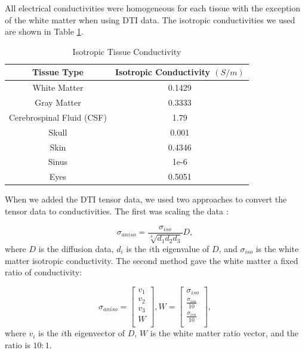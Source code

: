 All electrical conductivities were homogeneous for each tissue with the exception of the white matter when using DTI data. The isotropic conductivities \cite{ref:cond} we used are shown in Table \ref{tab:cond}.

\begin{table}[H]
\centering
\caption{Isotropic Tissue Conductivity}
\label{tab:cond}
\begin{tabular}{|c|c|}
\hline
Tissue Type               & Isotropic Conductivity $(S/m)$ \\ \hline
\hline
White Matter              & 0.1429                         \\ \hline
Gray Matter               & 0.3333                         \\ \hline
Cerebrospinal Fluid (CSF) & 1.79                           \\ \hline
Skull                     & 0.001                          \\ \hline
Skin                      & 0.4346                         \\ \hline
Sinus                     & 1e-6                           \\ \hline
Eyes                      & 0.5051                         \\ \hline
\end{tabular}
\end{table}

When we added the DTI tensor data, we used two approaches to convert the tensor data to conductivities. The first was scaling the data \cite{ref:scaling}: 

\begin{equation}
\label{eq:scaling}
\sigma_{aniso} = \frac{\sigma_{iso}}{\sqrt[3]{d_1d_2d_3}}D,
\end{equation}
where $D$ is the diffusion data, $d_i$ is the $i$th eigenvalue of $D$, and $\sigma_{iso}$ is the white matter isotropic conductivity. The second method gave the white matter a fixed ratio of conductivity:

\begin{equation}
\label{eq:fixed}
\sigma_{aniso} = \begin{bmatrix}
v_1\\
v_2\\
v_3\\
W\\
\end{bmatrix}, 
W = \begin{bmatrix}
\sigma_{iso}\\
\frac{\sigma_{iso}}{10}\\
\frac{\sigma_{iso}}{10}\\
\end{bmatrix},
\end{equation}
where $v_i$ is the $i$th eigenvector of $D$, $W$ is the white matter ratio vector, and the ratio is $10:1$.

